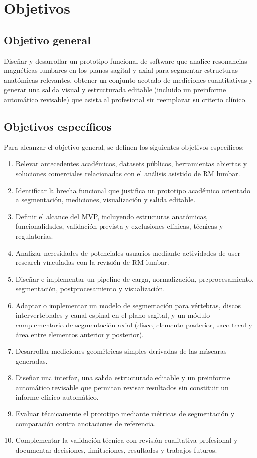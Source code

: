 \chapter{Objetivos}

\section{Objetivo general}

Diseñar y desarrollar un prototipo funcional de software que analice resonancias magnéticas lumbares en los planos sagital y axial para segmentar estructuras anatómicas relevantes, obtener un conjunto acotado de mediciones cuantitativas y generar una salida visual y estructurada editable (incluido un preinforme automático revisable) que asista al profesional sin reemplazar su criterio clínico.

\section{Objetivos específicos}

Para alcanzar el objetivo general, se definen los siguientes objetivos específicos:

\begin{enumerate}
  \item Relevar antecedentes académicos, datasets públicos, herramientas abiertas y soluciones comerciales relacionadas con el análisis asistido de RM lumbar.
  \item Identificar la brecha funcional que justifica un prototipo académico orientado a segmentación, mediciones, visualización y salida editable.
  \item Definir el alcance del MVP, incluyendo estructuras anatómicas, funcionalidades, validación prevista y exclusiones clínicas, técnicas y regulatorias.
  \item Analizar necesidades de potenciales usuarios mediante actividades de user research vinculadas con la revisión de RM lumbar.
  \item Diseñar e implementar un pipeline de carga, normalización, preprocesamiento, segmentación, postprocesamiento y visualización.
  \item Adaptar o implementar un modelo de segmentación para vértebras, discos intervertebrales y canal espinal en el plano sagital, y un módulo complementario de segmentación axial (disco, elemento posterior, saco tecal y área entre elementos anterior y posterior).
  \item Desarrollar mediciones geométricas simples derivadas de las máscaras generadas.
  \item Diseñar una interfaz, una salida estructurada editable y un preinforme automático revisable que permitan revisar resultados sin constituir un informe clínico automático.
  \item Evaluar técnicamente el prototipo mediante métricas de segmentación y comparación contra anotaciones de referencia.
  \item Complementar la validación técnica con revisión cualitativa profesional y documentar decisiones, limitaciones, resultados y trabajos futuros.
\end{enumerate}
